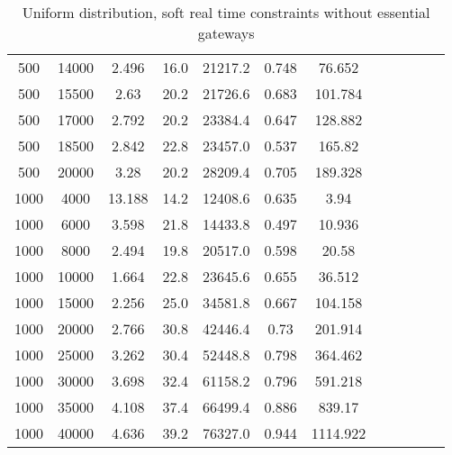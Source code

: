 \begin{table}[htb]
\begin{tabular}{|c|c|c|c|c|c|c|c|c|c|c|c|}
		500 & 14000 & 2.496 & 16.0 & 21217.2 & 0.748 & 76.652 & & & & &  \\ 
		500 & 15500 & 2.63 & 20.2 & 21726.6 & 0.683 & 101.784 & & & & &  \\ 
		500 & 17000 & 2.792 & 20.2 & 23384.4 & 0.647 & 128.882 & & & & &  \\ 
		500 & 18500 & 2.842 & 22.8 & 23457.0 & 0.537 & 165.82 & & & & &  \\ 
		500 & 20000 & 3.28 & 20.2 & 28209.4 & 0.705 & 189.328 & & & & &  \\ 
		1000 & 4000 & 13.188 & 14.2 & 12408.6 & 0.635 & 3.94 & & & & &  \\ 
		1000 & 6000 & 3.598 & 21.8 & 14433.8 & 0.497 & 10.936 & & & & &  \\ 
		1000 & 8000 & 2.494 & 19.8 & 20517.0 & 0.598 & 20.58 & & & & &  \\ 
		1000 & 10000 & 1.664 & 22.8 & 23645.6 & 0.655 & 36.512 & & & & &  \\ 
		1000 & 15000 & 2.256 & 25.0 & 34581.8 & 0.667 & 104.158 & & & & &  \\ 
		1000 & 20000 & 2.766 & 30.8 & 42446.4 & 0.73 & 201.914 & & & & &  \\ 
		1000 & 25000 & 3.262 & 30.4 & 52448.8 & 0.798 & 364.462 & & & & &  \\ 
		1000 & 30000 & 3.698 & 32.4 & 61158.2 & 0.796 & 591.218 & & & & &  \\ 
		1000 & 35000 & 4.108 & 37.4 & 66499.4 & 0.886 & 839.17 & & & & &  \\ 
		1000 & 40000 & 4.636 & 39.2 & 76327.0 & 0.944 & 1114.922 & & & & &  \\ 
		\hline 
	\end{tabular} 
	\caption{Uniform distribution, soft real time constraints without essential gateways} 
	\label{tab:unif_soft_n_esc} 
\end{table} 

